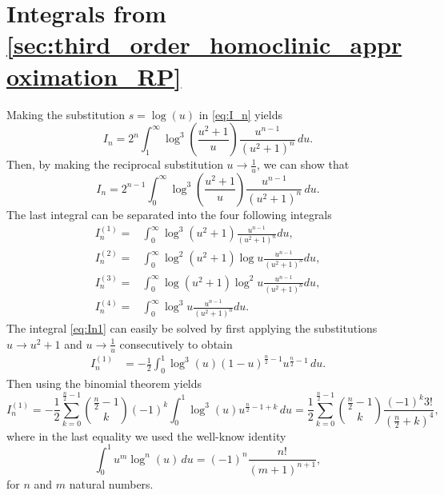 \section[Integrals from section 2.3.1]{Integrals from
\texorpdfstring{\cref{sec:third_order_homoclinic_approximation_RP}}{subsection 3.1.1}}%
\label{sec:I_n}
Making the substitution $s=\log(u)$ in \cref{eq:I_n} yields
\begin{equation*}
    I_n = 2^n \int_1^\infty \log^3\left(\frac{u^2+1}{u}\right) \frac{u^{n-1}}{(u^2+1)^n} \, du.
\end{equation*}
Then, by making the reciprocal substitution $u \to \frac{1}{u}$, we can show
that
\begin{equation*}
    I_n = 2^{n-1} \int_0^\infty \log^3\left(\frac{u^2+1}{u}\right)
            \frac{u^{n-1}}{(u^2+1)^n} \, du.
\end{equation*}
The last integral can be separated into the four following integrals
\begin{align}
    I_n^{(1)} =& \int_0^\infty \log^3(u^2+1) \frac{u^{n-1}}{(u^2+1)^n} du
              \label{eq:In1}, \\
    I_n^{(2)} =& \int_0^\infty \log^2(u^2+1)\log u \frac{u^{n-1}}{(u^2+1)^n} du 
              \label{eq:In2}, \\
    I_n^{(3)} =& \int_0^\infty \log(u^2+1)\log^2 u \frac{u^{n-1}}{(u^2+1)^n} du 
              \label{eq:In3}, \\
    I_n^{(4)} =& \int_0^\infty \log^3 u \frac{u^{n-1}}{(u^2+1)^n} du
              \label{eq:In4}.
\end{align}
The integral \cref{eq:In1} can easily be solved by first applying the
substitutions $u\to u^2+1$ and $u\to\frac1u$ consecutively to obtain
\begin{align*}
    I_n^{(1)} 
    &{}= - \frac12 \int_0^1 \log^3 (u) 
        \left(1-u\right)^{\frac{n}{2}-1}u^{\frac{n}{2}-1} \, du.
\end{align*}
Then using the binomial theorem yields
\begin{equation*}
    I_n^{(1)} 
= - \frac12 \sum_{k=0}^{\frac{n}{2}-1} \binom{\frac{n}{2}-1}k (-1)^k 
            \int_0^1 \log^3 (u) u^{\frac{n}{2}-1+k} \, du
    = \frac12 \sum_{k=0}^{\frac{n}{2}-1} \binom{\frac{n}{2}-1}k
    \frac{(-1)^k 3!}{({\frac{n}{2}+k})^4},
\end{equation*}
where in the last equality we used the well-know identity
\begin{equation}
    \label{eq:int01umlogn}
    \int_0^1 u^m \log^n (u) \, du = (-1)^n \frac{n!}{(m+1)^{n+1}},
\end{equation}
for $n$ and $m$ natural numbers.

